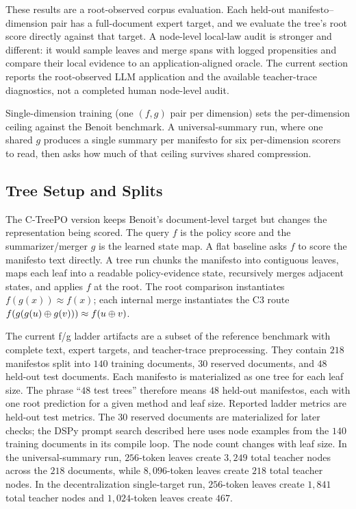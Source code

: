 These results are a root-observed corpus evaluation. Each held-out
manifesto--dimension pair has a full-document expert target, and we evaluate
the tree's root score directly against that target. A node-level local-law
audit is stronger and different: it would sample leaves and merge spans with
logged propensities and compare their local evidence to an application-aligned
oracle. The current section reports the root-observed LLM application and the
available teacher-trace diagnostics, not a completed human node-level audit.

Single-dimension training (one $(f, g)$ pair per dimension) sets the
per-dimension ceiling against the Benoit benchmark. A universal-summary run,
where one shared $g$ produces a single summary per manifesto for six
per-dimension scorers to read, then asks how much of that ceiling survives
shared compression.

\subsection{Tree Setup and Splits}\label{sec:min-manifesto-tree-setup}

The C-TreePO version keeps Benoit's document-level target but changes the
representation being scored. The query $f$ is the policy score and the
summarizer/merger $g$ is the learned state map. A flat baseline asks $f$ to
score the manifesto text directly. A tree run chunks the manifesto into
contiguous leaves, maps each leaf into a readable policy-evidence state,
recursively merges adjacent states, and applies $f$ at the root. The root
comparison instantiates $f(g(x))\approx f(x)$; each internal merge
instantiates the C3 route
$f(g(g(u)\oplus g(v)))\approx f(u\oplus v)$.

The current f/g ladder artifacts are a subset of the reference benchmark with
complete text, expert targets, and teacher-trace preprocessing. They contain
$218$ manifestos split into $140$ training documents, $30$ reserved documents,
and $48$ held-out test documents. Each manifesto is materialized as one tree
for each leaf size. The phrase ``$48$ test trees'' therefore means $48$
held-out manifestos, each with one root prediction for a given method and leaf
size. Reported ladder metrics are held-out test metrics. The $30$ reserved
documents are materialized for later checks; the DSPy prompt search described
here uses node examples from the $140$ training documents in its compile loop.
The node count changes with leaf size. In the universal-summary run,
$256$-token leaves create $3{,}249$ total teacher nodes across the $218$
documents, while $8{,}096$-token leaves create $218$ total teacher nodes. In
the decentralization single-target run, $256$-token leaves create $1{,}841$
total teacher nodes and $1{,}024$-token leaves create $467$.

